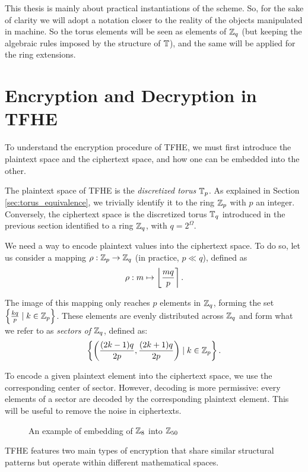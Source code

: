 This thesis is mainly about practical instantiations of the scheme. So, for the sake of clarity we will adopt a notation closer to the reality of the objects manipulated in machine. So the torus elements will be seen as elements of $\mathbb{Z}_q$ (but keeping the algebraic rules imposed by the structure of $\mathbb{T}$), and the same will be applied for the ring extensions. 



\section{Encryption and Decryption in TFHE}

To understand the encryption procedure of TFHE, we must first introduce the plaintext space and the ciphertext space, and how one can be embedded into the other.

The plaintext space of TFHE is the \textit{discretized torus} $\mathbb{T}_p$. As explained in Section \ref{sec:torus_equivalence}, we trivially identify it to the ring $\mathbb{Z}_p$ with $p$ an integer. Conversely, the ciphertext space is the discretized torus $\mathbb{T}_q$ introduced in the previous section identified to a ring $\mathbb{Z}_q$, with $q = 2^\Omega$. 


We need a way to encode plaintext values into the ciphertext space. To do so, let us consider a mapping $\rho: \mathbb{Z}_p \rightarrow \mathbb{Z}_q$ (in practice, $p \ll q$), defined as \[
\rho: m  \mapsto \left \lfloor \frac{m q} {p} \right \rceil.
\]


The image of this mapping only reaches $p$ elements in $\mathbb{Z}_q$, forming the set $\left \{ \frac {k q}{p} \mid k \in \mathbb{Z}_p \right \}$. These elements are evenly distributed across $\mathbb{Z}_q$ and form what we refer to as \emph{sectors of $\mathbb{Z}_q$}, defined as: \[
\left \{ \left ( \frac{(2 k - 1)q}{2p}, \frac{(2k + 1)q}{2p} \right ) \mid k \in \mathbb{Z}_p \right \}.
\]

To encode a given plaintext element into the ciphertext space, we use the corresponding center of sector. However, decoding is more permissive: every elements of a sector are decoded by the corresponding plaintext element. This will be useful to remove the noise in ciphertexts.

\begin{figure}[htbp]
	\centering
	\caption{An example of embedding of $\mathbb{Z}_8$ into $\mathbb{Z}_{50}$}
\end{figure}


TFHE features two main types of encryption that share similar structural patterns but operate within different mathematical spaces.


